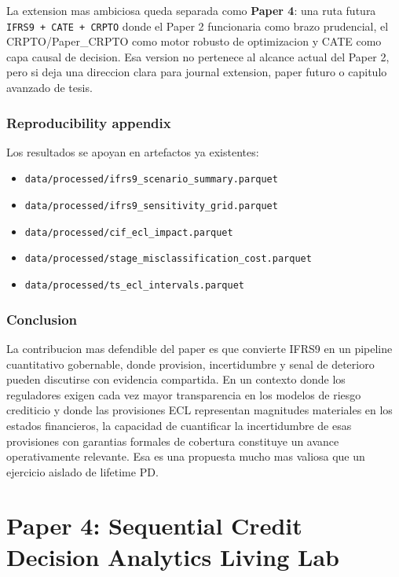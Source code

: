 \documentclass[
  spanish,
  11pt,
  letterpaper,
]{scrbook}
\providecommand{\tightlist}{%
  \setlength{\itemsep}{0pt}\setlength{\parskip}{0pt}}
\theoremstyle{plain}
\theoremstyle{remark}
\begin{document}
La extension mas ambiciosa queda separada como \textbf{Paper 4}: una
ruta futura \texttt{IFRS9\ +\ CATE\ +\ CRPTO} donde el Paper 2
funcionaria como brazo prudencial, el CRPTO/Paper\_CRPTO como motor
robusto de optimizacion y CATE como capa causal de decision. Esa version
no pertenece al alcance actual del Paper 2, pero si deja una direccion
clara para journal extension, paper futuro o capitulo avanzado de tesis.

\subsection{Reproducibility appendix}\label{reproducibility-appendix}

Los resultados se apoyan en artefactos ya existentes:

\begin{itemize}
\tightlist
\item
  \texttt{data/processed/ifrs9\_scenario\_summary.parquet}
\item
  \texttt{data/processed/ifrs9\_sensitivity\_grid.parquet}
\item
  \texttt{data/processed/cif\_ecl\_impact.parquet}
\item
  \texttt{data/processed/stage\_misclassification\_cost.parquet}
\item
  \texttt{data/processed/ts\_ecl\_intervals.parquet}
\end{itemize}

\subsection{Conclusion}\label{sec-p2-conclusion}

La contribucion mas defendible del paper es que convierte IFRS9 en un
pipeline cuantitativo gobernable, donde provision, incertidumbre y senal
de deterioro pueden discutirse con evidencia compartida. En un contexto
donde los reguladores exigen cada vez mayor transparencia en los modelos
de riesgo crediticio y donde las provisiones ECL representan magnitudes
materiales en los estados financieros, la capacidad de cuantificar la
incertidumbre de esas provisiones con garantias formales de cobertura
constituye un avance operativamente relevante. Esa es una propuesta
mucho mas valiosa que un ejercicio aislado de lifetime PD.

\chapter{Paper 4: Sequential Credit Decision Analytics Living
Lab}\label{paper-4-sequential-credit-decision-analytics-living-lab}
\end{document}
